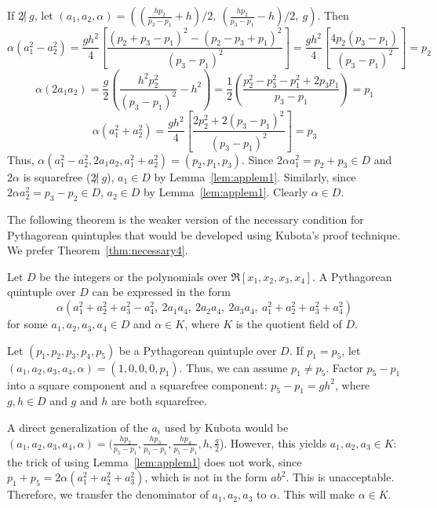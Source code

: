 If $2 \not | \ g$, let $(a_1,a_2,\alpha) = 
((\frac{hp_2}{p_3 - p_1} + h)/2, \ 
 (\frac{hp_2}{p_3 - p_1} - h)/2, \ g)$.
Then 
\[
\alpha (a_1^2 - a_2^2) = 
\frac{gh^2}{4}[\frac{(p_2+p_3-p_1)^2 - (p_2-p_3+p_1)^2}{(p_3-p_1)^2}] = 
\frac{gh^2}{4}[\frac{4p_2(p_3-p_1)}{(p_3-p_1)^2}] = 
p_2
\]
\[
\alpha (2a_1 a_2) = \frac{g}{2} (\frac{h^2p_2^2}{(p_3-p_1)^2} - h^2) = 
\frac{1}{2}(\frac{p_2^2 - p_3^2 - p_1^2 + 2p_3p_1}{p_3-p_1}) = 
p_1
\]
\[
\alpha(a_1^2 + a_2^2)
= \frac{gh^2}{4} [\frac{2p_2^2 + 2(p_3 - p_1)^2}{(p_3-p_1)^2}] = p_3
\]
Thus, $\alpha (a_1^2 - a_2^2, 2a_1a_2, a_1^2 + a_2^2) = (p_2,p_1,p_3)$.
Since $2 \alpha a_1^2 = p_2 + p_3 \in D$ and $2 \alpha$ is squarefree
($2 \not | \ g$), $a_1 \in D$ by Lemma~\ref{lem:applem1}.
Similarly, since $2 \alpha a_2^2 = p_3 - p_2 \in D$,
$a_2 \in D$ by Lemma~\ref{lem:applem1}.
Clearly $\alpha \in D$.
\QED

\ifFull
The following theorem is the weaker version of the necessary condition
for Pythagorean quintuples that would be developed using Kubota's proof technique.
We prefer Theorem~\ref{thm:necessary4}.

\begin{theorem}
\label{thm:kubotaversion}
Let $D$ be the integers or the polynomials over $\Re[x_1,x_2,x_3,x_4]$.
A Pythagorean quintuple over $D$ can be expressed in the form
\begin{equation}
\label{eq:pythorig}
	\alpha (a_1^2 + a_2^2 + a_3^2 - a_4^2,
		\ 2a_1a_4,\ 2a_2a_4,\ 2a_3a_4,
		\ a_1^2 + a_2^2 + a_3^2 + a_4^2)
\end{equation}
for some $a_1,a_2,a_3,a_4 \in D$ and $\alpha \in K$, where
$K$ is the quotient field of $D$.
\end{theorem}
\prf
Let $(p_1,p_2,p_3,p_4,p_5)$ be a Pythagorean quintuple over $D$.
If $p_1=p_5$, let $(a_1,a_2,a_3,a_4,\alpha) = (1,0,0,0,p_1)$.
Thus, we can assume $p_1 \neq p_5$.
Factor $p_5 - p_1$ into a square component and a squarefree component:
$p_5 - p_1 = gh^2$, where $g,h \in D$ and $g$ and $h$ are both
squarefree.

A direct generalization of the $a_i$ used by Kubota would be
$(a_1,a_2,a_3,a_4,\alpha) = 
(\frac{hp_2}{p_5 - p_1}, \frac{hp_3}{p_5 - p_1}, \frac{hp_4}{p_5 - p_1}, 
h, \frac{g}{2}$).
However, this yields $a_1,a_2,a_3 \in K$:
the trick of using Lemma~\ref{lem:applem1} does not work, 
since $p_1 + p_5 = 2\alpha(a_1^2 + a_2^2 + a_3^2)$,
which is not in the form $ab^2$.
This is unacceptable.
Therefore, we transfer the denominator of $a_1,a_2,a_3$ to $\alpha$.
This will make $\alpha \in K$.

